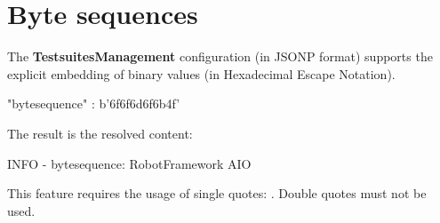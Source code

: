 \newpage

\section{Byte sequences}

The \textbf{TestsuitesManagement} configuration (in JSONP format) supports the explicit embedding of binary values
(in Hexadecimal Escape Notation).

\begin{robotcode}
"bytesequence" : b'\x6f\x6f\x6d\x6f\x6b\x4f'
\end{robotcode}

The result is the resolved content:


\begin{robotlog}
INFO - bytesequence: RobotFramework AIO
\end{robotlog}

This feature requires the usage of single quotes: . Double quotes must not be used.




